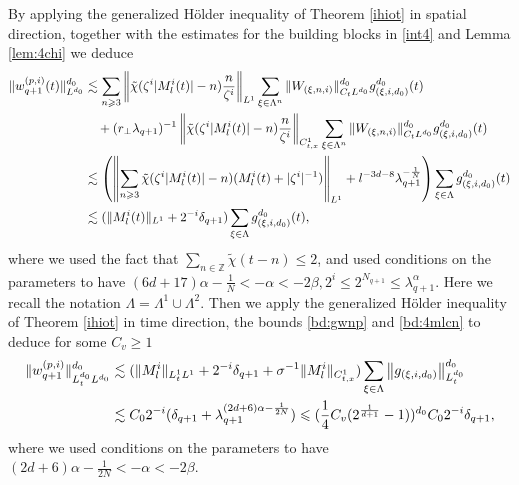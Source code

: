 \documentclass[UTF-8,reqno]{amsart}
\numberwithin{equation}{section}
\theoremstyle{definition}
\newcommand{\norm}[1]{\left\|#1\right\|}
\def\geq{\geqslant}
\def\leq{\leqslant}
\def\geq{\geqslant}
\def\leq{\leqslant}
\begin{document}
By applying the generalized H\"older inequality of 
Theorem \ref{ihiot} in spatial direction, together with the estimates for the building blocks in \eqref{int4} and Lemma \ref{lem:4chi} we deduce 
\begin{align}
\|w_{q+1}^{(p,i)}(t)\|^{d_0}_{L^{d_0}}%
&\lesssim\sum_{n\geq3}\norm{\tilde{\chi}(\zeta^{i}|M^{i}_l(t)|-n)\frac{n}{\zeta^{i}}}_{L^1}\sum_{\xi\in\Lambda^{n}}\|W_{(\xi,n,i)}\|_{C_tL^{d_0}}^{d_0}g_{(\xi,i,d_0)}^{d_0}(t)\notag\\ 
&\quad+(r_\perp\lambda_{q+1})^{-1}\norm{\tilde{\chi}(\zeta^{i}|M^{i}_l(t)|-n)\frac{n}{\zeta^{i}}}_{C_{t,x}^1}\sum_{\xi\in\Lambda^{n}}\|W_{(\xi,n,i)}\|_{C_tL^{d_0}}^{d_0}g_{(\xi,i,d_0)}^{d_0}(t)\notag\\
&\lesssim\left(\norm{\sum_{n\geq3}\tilde{\chi}(\zeta^{i}|M^{i}_l(t)|-n)(M^{i}_l(t)+|\zeta^{i}|^{-1}
)}_{L^1}+l^{-3d-8}\lambda_{q+1}^{-\frac{1}{N}}\right)\sum_{\xi\in\Lambda}g_{(\xi,i,d_0)}^{d_0}(t)\notag\\
&\lesssim (\|M^{i}_l(t)\|_{L^1}+2^{-i}\delta_{q+1})\sum_{\xi\in\Lambda}g_{(\xi,i,d_0)}^{d_0}(t)
,\notag
\end{align}
where we used   the fact that $\sum_{n\in\mathbb{Z}} \tilde{\chi}(t - n) \leq2$, and used conditions on the parameters to have $(6d+17)\alpha-\frac{1}{N}<-\alpha<-2\beta,2^{i}\leq 2^{N_{q+1}}\leq \lambda_{q+1}^{\alpha}$. Here we recall the notation $\Lambda=\Lambda^{1}\cup\Lambda^{2}$.
Then we apply the generalized H\"older inequality of Theorem \ref{ihiot} in time direction, the bounds \eqref{bd:gwnp} and \eqref{bd:4mlcn} to deduce  for some ${C}_v\geq1$
\begin{align}
\|w_{q+1}^{(p,i)}\|_{L^{d_0}_tL^{d_0}}^{d_0}&\lesssim (\|M^{i}_l\|_{L^1_tL^1}+2^{-i}\delta_{q+1}+\sigma^{-1}\|M^{i}_l\|_{C_{t,x}^1})\sum_{\xi\in\Lambda}\norm{g_{(\xi,i,d_0)}}^{d_0}_{L_t^{d_0}}
\notag\\
    &\lesssim C_02^{-i}(\delta_{q+1}+\lambda_{q+1}^{(2d+6)\alpha-\frac{1}{2N}})\leq (\frac14 C_v(2^{\frac1{d+1}}-1))^{d_0}C_02^{-i}\delta_{q+1},\label{bd:4wq+1pl2}
\end{align}
where we used  conditions on the parameters to have $(2d+6)\alpha-\frac{1}{2N}<-\alpha<-2\beta$.
\end{document}
